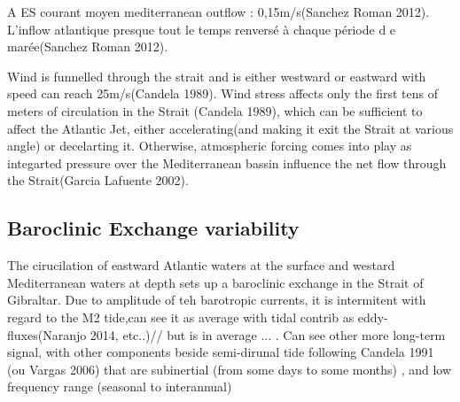 A ES courant moyen mediterranean outflow : 0,15m/s(Sanchez Roman 2012). L’inflow atlantique presque tout le temps renversé à chaque période d e marée(Sanchez Roman 2012).







 Wind is funnelled through the strait and is either westward or eastward with speed can reach 25m/s(Candela 1989). Wind stress affects only the first tens of meters of circulation in the Strait (Candela 1989), which can be sufficient to affect the Atlantic Jet, either accelerating(and making it exit the Strait at various angle) or decelarting it. Otherwise, atmospheric forcing comes into play as integarted pressure over the Mediterranean bassin influence the net flow through the Strait(Garcia Lafuente 2002).






\subsection{Baroclinic Exchange variability}

The cirucilation of eastward Atlantic waters at the surface and westard Mediterranean waters at depth sets up a baroclinic exchange in the Strait of Gibraltar. Due to amplitude of teh barotropic currents, it is intermitent with regard to the M2 tide,can see it as average with tidal contrib as eddy-fluxes(Naranjo 2014, etc..)//  but is in average ... .  Can see other more long-term signal, with other components beside semi-dirunal tide following Candela 1991 (ou Vargas 2006) that are subinertial (from some days to some months) , and low frequency range (seasonal to interannual)

